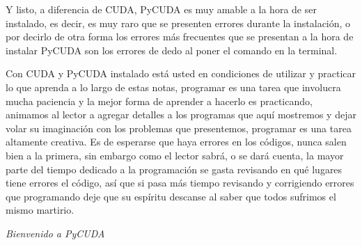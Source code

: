 \documentclass{article}
\begin{document}
Y listo, a diferencia de CUDA, PyCUDA es muy amable a la hora de ser
instalado, es decir, es muy raro que se presenten errores durante la
instalación, o por decirlo de otra forma los errores más frecuentes que
se presentan a la hora de instalar PyCUDA son los errores de dedo al
poner el comando en la terminal.

Con CUDA y PyCUDA instalado está usted en condiciones de utilizar y
practicar lo que aprenda a lo largo de estas notas, programar es una
tarea que involucra mucha paciencia y la mejor forma de aprender a
hacerlo es practicando, animamos al lector a agregar detalles a los
programas que aquí mostremos y dejar volar su imaginación con los
problemas que presentemos, programar es una tarea altamente creativa. Es
de esperarse que haya errores en los códigos, nunca salen bien a la
primera, sin embargo como el lector sabrá, o se dará cuenta, la mayor
parte del tiempo dedicado a la programación se gasta revisando en qué
lugares tiene errores el código, así que si pasa más tiempo revisando y
corrigiendo errores que programando deje que su espíritu descanse al
saber que todos sufrimos el mismo martirio.

\emph{Bienvenido a PyCUDA}


    
    
    
    
\end{document}
